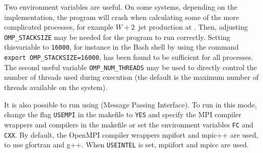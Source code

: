 Two environment variables are useful. On some systems, depending on the \OMP{} implementation,
the program will crash when calculating some of the more complicated processes,
for example $W+2$~jet production at \NLO{}.
Then, adjusting {\tt OMP\_STACKSIZE} may be needed for the program to run correctly.
Setting thisvariable to {\tt 16000}, for instance in the Bash shell by using the
command {\tt export OMP\_STACKSIZE=16000}, has been found to be sufficient
for all processes.  The second useful variable {\tt OMP\_NUM\_THREADS}
may be used to directly control the number of threads used during
\OMP{} execution (the default is the maximum number of threads available
on the system).

It is also possible to run \MCFM{} using \MPI{} (Message Passing Interface).
To run in this mode, change the flag {\tt USEMPI} in the makefile to {\tt YES} and specify the MPI compiler 
wrappers and compilers in the makefile or set the environment variables \texttt{FC} and \texttt{CXX}.
By default, the OpenMPI compiler wrappers mpifort and mpic++ are used,
to use gfortran and g++. When {\tt USEINTEL} is set, mpiifort and mpicc are used.
 
